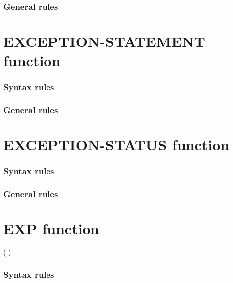 \subsubsection{General rules}

\section{EXCEPTION-STATEMENT function}

\begin{syntax}
   
\end{syntax}

\subsubsection{Syntax rules}

\subsubsection{General rules}

\section{EXCEPTION-STATUS function}

\begin{syntax}
   
\end{syntax}

\subsubsection{Syntax rules}

\subsubsection{General rules}

\section{EXP function}

\begin{syntax}
    ( \argument )
\end{syntax}

\subsubsection{Syntax rules}

